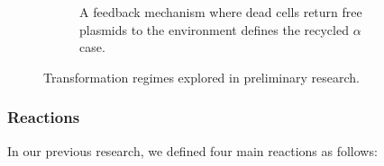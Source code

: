 \documentclass[numbib]{buthesis_p}  %
\begin{document}
\begin{figure}[h]
\begin{subfigure}{0.3\linewidth}
 \caption{A feedback mechanism where dead cells return free plasmids to
 the environment defines the recycled $\alpha$ case.}
 \label{fig:recycled}
\end{subfigure}
\caption{Transformation regimes explored in preliminary research.} %
\label{fig:transf}
\end{figure}



  \subsubsection{Reactions}
In our previous research, we defined four main reactions as follows:
\end{document}
